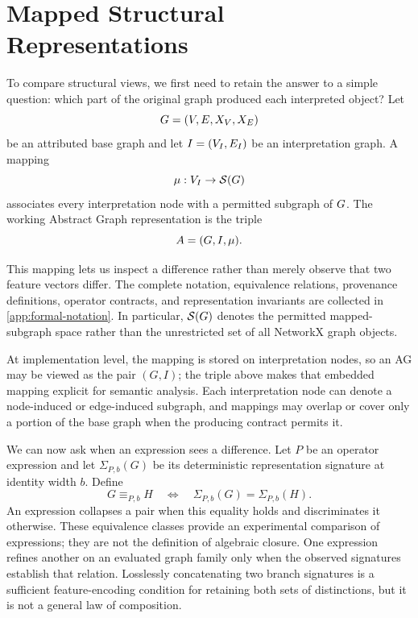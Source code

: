 \section{Mapped Structural Representations}
\label{sec:formalism}

To compare structural views, we first need to retain the answer to a simple
question: which part of the original graph produced each interpreted object?
Let
\begin{equation}
  G=(V,E,X_V,X_E)
\end{equation}
be an attributed base graph and let \(I=(V_I,E_I)\) be an
interpretation graph. A mapping
\begin{equation}
  \mu:V_I\rightarrow\mathcal{S}(G)
\end{equation}
associates every interpretation node with a permitted subgraph of
\(G\). The working Abstract Graph representation is the triple
\begin{equation}
  A=(G,I,\mu).
\end{equation}

This mapping lets us inspect a difference rather than merely observe that two
feature vectors differ. The complete notation, equivalence relations,
provenance definitions, operator contracts, and representation invariants are collected in
\cref{app:formal-notation}. In particular, \(\mathcal{S}(G)\) denotes
the permitted mapped-subgraph space rather than the unrestricted set of all
NetworkX graph objects.

At implementation level, the mapping is stored on interpretation nodes, so an
AG may be viewed as the pair $ (G,I) $; the triple above makes that embedded
mapping explicit for semantic analysis. Each interpretation node can denote a
node-induced or edge-induced subgraph, and mappings may overlap or cover only a
portion of the base graph when the producing contract permits it.

We can now ask when an expression sees a difference. Let $P$ be an operator
expression and let $\Sigma_{P,b}(G)$ be its
deterministic representation signature at identity width $b$. Define
\begin{equation}
  G\equiv_{P,b}H
  \quad\Longleftrightarrow\quad
  \Sigma_{P,b}(G)=\Sigma_{P,b}(H).
\end{equation}
An expression collapses a pair when this equality holds and discriminates it
otherwise. These equivalence classes provide an experimental comparison of
expressions; they are not the definition of algebraic closure. One expression
refines another on an evaluated graph family only when the observed signatures
establish that relation. Losslessly concatenating two branch signatures is a
sufficient feature-encoding condition for retaining both sets of distinctions,
but it is not a general law of composition.

